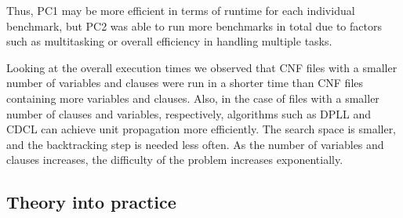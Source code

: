 \documentclass[runningheads]{llncs}
\begin{document}
\pgfplotsset{compat=1.18}




Thus, PC1 may be more efficient in terms of runtime for each individual benchmark, but PC2 was able to run more benchmarks in total due to factors such as multitasking or overall efficiency in handling multiple tasks.

Looking at the overall execution times we observed that CNF files with a smaller number of variables and clauses were run in a shorter time than CNF files containing more variables and clauses. Also, in the case of files with a smaller number of clauses and variables, respectively, algorithms such as DPLL and CDCL can achieve unit propagation more efficiently. The search space is smaller, and the backtracking step is needed less often. As the number of variables and clauses increases, the difficulty of the problem increases exponentially. 

\subsection{Theory into practice}
\end{document}
